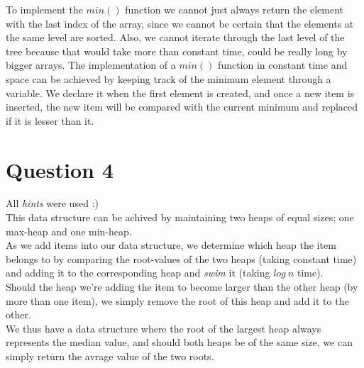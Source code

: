 \documentclass[a4paper]{article}
\begin{document}
\noindent
To implement the $min()$ function we cannot just always return the element with 
the last index of the array, since we cannot be certain that the elements at the 
same level are sorted. Also, we cannot iterate through the last level of the tree 
because that would take more than constant time, could be really long by bigger arrays.  
The implementation of a $min()$ function in constant time and space can be 
achieved by keeping track of the minimum element through a variable. We declare it when 
the first element is created, and once a new item is inserted, the new item will be 
compared with the current minimum and replaced if it is lesser than it.


\section*{Question 4}

\noindent
All \textit{hints} were used :) 
\ \\

\noindent
This data structure can be achived by maintaining two heaps of equal sizes; one max-heap and one min-heap.\ \\

\noindent
As we add items into our data structure, we determine which heap the item belongs to by comparing the root-values
of the two heaps (taking constant time) and adding it to the corresponding heap and \textit{swim} it (taking $log~n$ time).\ \\

\noindent
Should the heap we're adding the item to become larger than the other heap (by more than one item), we simply remove the root 
of this heap and add it to the other. \ \\

\noindent
We thus have a data structure where the root of the largest heap always represents the median value, and should both heaps 
be of the same size, we can simply return the avrage value of the two roots. 
\end{document}
